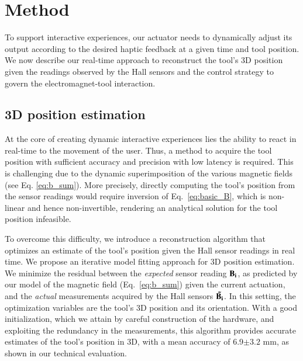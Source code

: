 \section{Method}
To support interactive experiences, our actuator needs to dynamically adjust its output according to the desired haptic feedback at a given time and tool position.
We now describe our real-time approach to reconstruct the tool's 3D position given the readings observed by the Hall sensors and the control strategy to govern the electromagnet-tool interaction.

\subsection{3D position estimation}
At the core of creating dynamic interactive experiences lies the ability to react in real-time to the movement of the user. Thus, a method to acquire the tool position with sufficient accuracy and precision with low latency is required. This is challenging due to the dynamic superimposition of the various magnetic fields (see Eq. \ref{eq:b_sum}). More precisely, directly computing the tool's position from the sensor readings would require inversion of Eq.~\ref{eq:basic_B}, which is non-linear and hence non-invertible, rendering an analytical solution for the tool position infeasible.

To overcome this difficulty, we introduce a reconstruction algorithm that optimizes an estimate of the tool's position given the Hall sensor readings in real time. We propose an iterative model fitting approach for 3D position estimation. We minimize the residual between the \emph{expected} sensor reading $\mathbf{B_i}$, as predicted by our model of the magnetic field (Eq.~\ref{eq:b_sum}) given the current actuation, and the \emph{actual} measurements acquired by the Hall sensors $\mathbf{\Tilde{B_i}}$. In this setting, the optimization variables are the tool's 3D position and its orientation. With a good initialization, which we attain by careful construction of the hardware, and exploiting the redundancy in the measurements, this algorithm provides accurate estimates of the tool's position in 3D, with a mean accuracy of 6.9$\pm 3.2$ mm, as shown in our technical evaluation.

